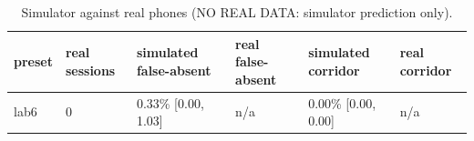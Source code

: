 \begin{table}[t]
\centering
\caption{Simulator against real phones (NO REAL DATA: simulator prediction only).}\label{tab:e12}
\begin{tabular}{llllll}
\toprule
preset & real sessions & simulated false-absent & real false-absent & simulated corridor & real corridor \\
\midrule
lab6 & 0 & 0.33\% [0.00, 1.03] & n/a & 0.00\% [0.00, 0.00] & n/a \\
\bottomrule
\end{tabular}
\end{table}
